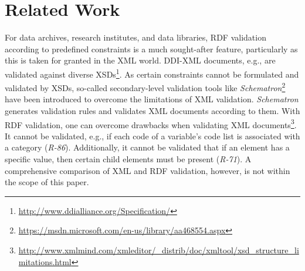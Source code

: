 \documentclass{llncs}
\newcommand{\ke}[1]{\todo[size=\small, color=red!40]{\textbf{Kai:} #1}}
\newcommand{\tb}[1]{\todo[size=\small, color=green!40]{\textbf{Thomas:} #1}}
\begin{document}
 


\section{Related Work}
\label{related-work}

For data archives, research institutes, and data libraries,
RDF validation according to predefined constraints is a much sought-after feature, 
particularly as this is taken for granted in the XML world.
DDI-XML documents, e.g., are validated against diverse XSDs\footnote{\url{http://www.ddialliance.org/Specification/}}.
As certain constraints cannot be formulated and validated by XSDs, 
so-called secondary-level validation tools like \emph{Schematron}\footnote{\url{https://msdn.microsoft.com/en-us/library/aa468554.aspx}} have been introduced to overcome the limitations of XML validation.
\emph{Schematron} generates validation rules and validates XML documents according to them.
With RDF validation, one can overcome drawbacks when validating XML documents\footnote{\url{http://www.xmlmind.com/xmleditor/_distrib/doc/xmltool/xsd_structure_limitations.html}}.
It cannot be validated, e.g., if each code of a variable's code list is associated with a category (\emph{R-86}).
Additionally, it cannot be validated that if an element has a specific value, then certain child elements must be present (\emph{R-71}).  
A comprehensive comparison of XML and RDF validation, however, is not within the scope of this paper.
\end{document}
